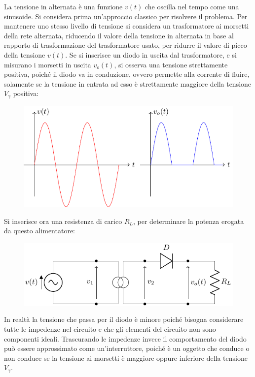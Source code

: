 \documentclass{article}
\numberwithin{equation}{subsection}
\begin{document}
La tensione in alternata è una funzione $v(t)$ che oscilla nel tempo come una sinusoide. 
Si considera prima un'approccio classico per risolvere il problema. 
Per mantenere uno stesso livello di tensione si considera un trasformatore ai 
morsetti della rete alternata, riducendo il valore della tensione in alternata in base al rapporto di trasformazione del trasformatore usato, per ridurre il valore di picco 
della tensione $v(t)$. 
Se si inserisce un diodo in uscita dal trasformatore, e si misurano i morsetti in uscita $v_o(t)$, si osserva una tensione strettamente positiva, poiché il diodo va 
in conduzione, ovvero permette alla corrente di fluire, solamente se la tensione in entrata ad esso è strettamente maggiore della tensione $V_{\gamma}$ positiva:
\begin{figure}[H]%
    \centering
    \includegraphics{andamento-alimentatore-diodo.pdf}%
    \label{fig:andamento-alimentatore-diodo}
\end{figure}
Si inserisce ora una resistenza di carico $R_L$, per determinare la potenza erogata da questo alimentatore:
\begin{figure}[H]%
    \centering
    \includegraphics{alimentatore-diodo.pdf}%
    \label{fig:alimentatore-diodo}
\end{figure}

In realtà la tensione che passa per il diodo è minore poiché bisogna considerare tutte le impedenze nel circuito e che gli elementi del circuito non sono componenti 
ideali. Trascurando le impedenze invece il comportamento del diodo 
può essere approssimato come un'interruttore, poiché è un oggetto che conduce o non conduce se la tensione ai morsetti è maggiore oppure inferiore della tensione $V_{\gamma}$. 
\end{document}
